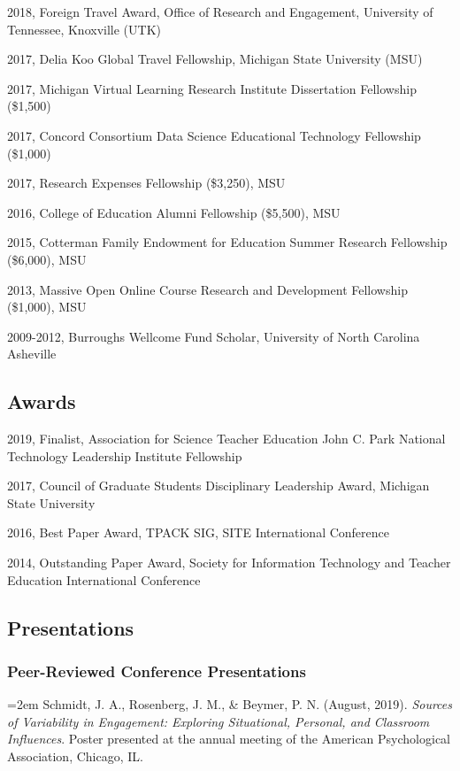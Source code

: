 \documentclass[14,]{article}
\begin{document}
2018, Foreign Travel Award, Office of Research and Engagement,
University of Tennessee, Knoxville (UTK)

2017, Delia Koo Global Travel Fellowship, Michigan State University
(MSU)

2017, Michigan Virtual Learning Research Institute Dissertation
Fellowship (\$1,500)

2017, Concord Consortium Data Science Educational Technology Fellowship
(\$1,000)

2017, Research Expenses Fellowship (\$3,250), MSU

2016, College of Education Alumni Fellowship (\$5,500), MSU

2015, Cotterman Family Endowment for Education Summer Research
Fellowship (\$6,000), MSU

2013, Massive Open Online Course Research and Development Fellowship
(\$1,000), MSU

2009-2012, Burroughs Wellcome Fund Scholar, University of North Carolina
Asheville

\hypertarget{awards}{%
\subsection{Awards}\label{awards}}

2019, Finalist, Association for Science Teacher Education John C. Park
National Technology Leadership Institute Fellowship

2017, Council of Graduate Students Disciplinary Leadership Award,
Michigan State University

2016, Best Paper Award, TPACK SIG, SITE International Conference

2014, Outstanding Paper Award, Society for Information Technology and
Teacher Education International Conference

\hypertarget{presentations}{%
\subsection{Presentations}\label{presentations}}

\hypertarget{peer-reviewed-conference-presentations}{%
\subsubsection{Peer-Reviewed Conference
Presentations}\label{peer-reviewed-conference-presentations}}

\hangindent=2em Schmidt, J. A., Rosenberg, J. M., \& Beymer, P. N.
(August, 2019). \emph{Sources of Variability in Engagement: Exploring
Situational, Personal, and Classroom Influences}. Poster presented at
the annual meeting of the American Psychological Association, Chicago,
IL.
\end{document}
